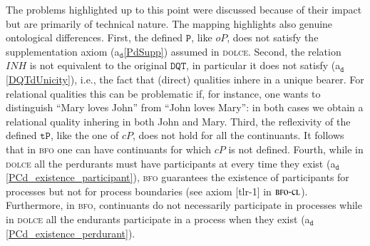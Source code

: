 \documentclass[ao]{iosart2x}
\newcommand{\nb}[1]{\textcolor{red}{$|$}\marginpar{\hspace*{-0cm}\parbox{20mm}{\scriptsize\raggedright\textcolor{red}{#1}}}}
\newcommand{\bflist}{\begin{list}{}{\setlength{\topsep}{2mm}\setlength{\parsep}{0mm}\setlength{\leftmargin}{9.2mm}\setlength{\labelwidth}{8mm}}}
\newcommand{\eflist}{\end{list}}
\newcommand{\dolceAxLabel}{\textrm{a$_\texttt{d}$}}
\newcommand{\dolceAxLabelscript}{\scriptsize \textrm{a$_\texttt{d}$}}
\newcommand{\bdThrLabel}{\textrm{t$_\texttt{bd}$}}
\newcounter{cntax}
\newcommand{\dolceax}[1]{\refstepcounter{cntax}\begin{small}{\bf \dolceAxLabelscript\thecntax\label{#1}}\end{small}}
\newcounter{cntbdth}
\newcommand{\bdth}[1]{\refstepcounter{cntbdth}\begin{small}{\bf \bdThrLabel\thecntbdth\label{#1}}\end{small}}
\newcommand{\refdolceax}[1]{({\dolceAxLabel}\ref{#1})}
\newcommand{\pr}[1]{\mathtt{#1}}
\newcommand{\prbfo}[1]{{\textit{{#1}}}}
\newcommand{\dolce}{{\textsc{dolce}}}
\newcommand{\bfo}{{\textsc{bfo}}}
\newcommand{\bfocl}{{\textsc{bfo-cl}}}
\newcommand {\thbfobdmap} {\ensuremath{\mathfrak{B}_\texttt{d}}}
\newcommand {\ABdcat} {\textsc{ab}}
\newcommand {\EDdcat} {\textsc{ed}}
\newcommand {\PDdcat} {\textsc{pd}}
\newcommand {\TPd} {\ensuremath{\pr{tP}}}
\newcommand {\Pd} {\ensuremath{\pr{P}}}
\newcommand {\Od} {\ensuremath{\pr{O}}}
\newcommand {\PREd} {\ensuremath{\pr{PRE}}}
\newcommand {\DQTd} {\ensuremath{\pr{DQT}}}
\newcommand {\PCd} {\ensuremath{\pr{PC}}}
\newcommand{\bfocpart}{\prbfo{cP}}
\newcommand{\bfoopart}{\prbfo{oP}}
\newcommand{\bfoinh}{\prbfo{INH}}
\begin{document}
The problems highlighted up to this point were discussed because of their impact but are primarily of technical nature. The mapping highlights also genuine ontological differences.
First, the defined $\Pd$, like $\bfoopart$, does not satisfy the supplementation axiom \refdolceax{PdSupp} assumed in {\dolce}. Second, the relation $\bfoinh$ is not equivalent to the original $\DQTd$, in particular it does not satisfy \refdolceax{DQTdUnicity}, i.e., the fact that (direct) qualities inhere in a unique bearer. For relational qualities this can be problematic if, for instance, one wants to distinguish ``Mary loves John'' from ``John loves Mary'': in both cases we obtain a relational quality inhering in both John and Mary. Third, the reflexivity of the defined $\TPd$, like the one of $\bfocpart$, does not hold for all the continuants. It follows that in {\bfo} one can have continuants for which $\bfocpart$ is not defined.  Fourth, while in {\dolce} all the perdurants must have participants at every time they exist \refdolceax{PCd_existence_participant}, {\bfo} guarantees the existence of participants for processes but not for process boundaries (see axiom [tlr-1] in $\bfocl$). Furthermore, in {\bfo}, continuants do not necessarily participate in processes while in {\dolce} all the endurants participate in a process when they exist \refdolceax{PCd_existence_perdurant}.
%
%
%
%
%
\end{document}
